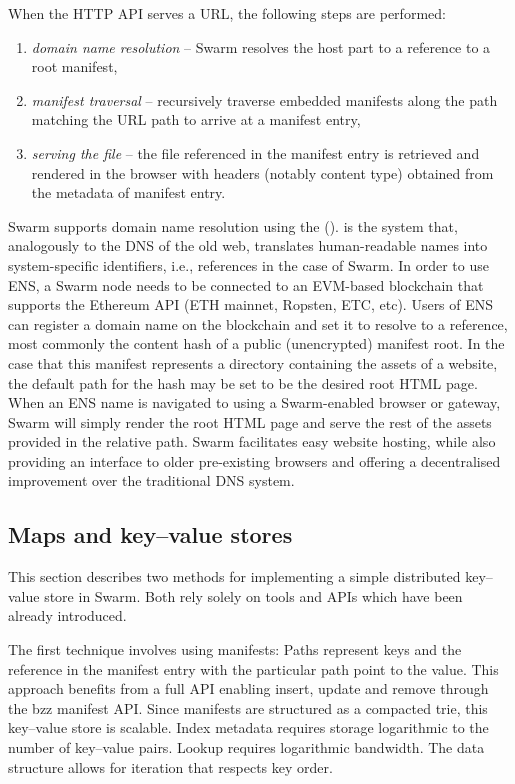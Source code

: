 When the HTTP API serves a URL, the following steps are performed:

\begin{enumerate}
    \item \emph{domain name resolution} -- Swarm resolves the host part to a reference to a root manifest,
    \item \emph{manifest traversal} -- recursively traverse embedded manifests along the path matching the URL path to arrive at a manifest entry,
    \item \emph{serving the file} -- the file referenced in the manifest entry is retrieved and rendered in the browser with headers (notably content type) obtained from  the metadata of manifest entry.
\end{enumerate}

Swarm supports domain name resolution using the  ().  is the system that, analogously to the DNS of the old web, translates human-readable names into system-specific identifiers, i.e., references in the case of Swarm.
%
In order to use ENS, a Swarm node needs to be connected to an EVM-based blockchain that supports the Ethereum API (ETH mainnet, Ropsten, ETC, etc). 
Users of ENS can register a domain name on the blockchain and set it to resolve to a reference, most commonly the content hash of a public (unencrypted) manifest root. In the case that this manifest represents a directory containing the assets of a website, the default path for the hash may be set to be the desired root HTML page. When an ENS name is navigated to using a Swarm-enabled browser or gateway, Swarm will simply render the root HTML page and serve the rest of the assets provided in the relative path. Swarm facilitates easy website hosting, while also providing an interface to older pre-existing browsers and offering a decentralised improvement over the traditional DNS system.


\subsection{Maps and key--value stores\statusgreen}\label{sec:maps}

This section describes two methods for implementing a simple distributed key--value store in Swarm. Both rely solely on tools and APIs which have been already introduced.

The first technique involves using manifests: Paths represent keys and the reference in the manifest entry with the particular path point to the value. This approach benefits from a full API enabling insert, update and remove through the bzz manifest API. Since manifests are structured as a compacted trie, this key--value store is scalable. Index metadata requires storage logarithmic to the number of key--value pairs. Lookup requires logarithmic bandwidth. The data structure allows for iteration that respects key order. 

